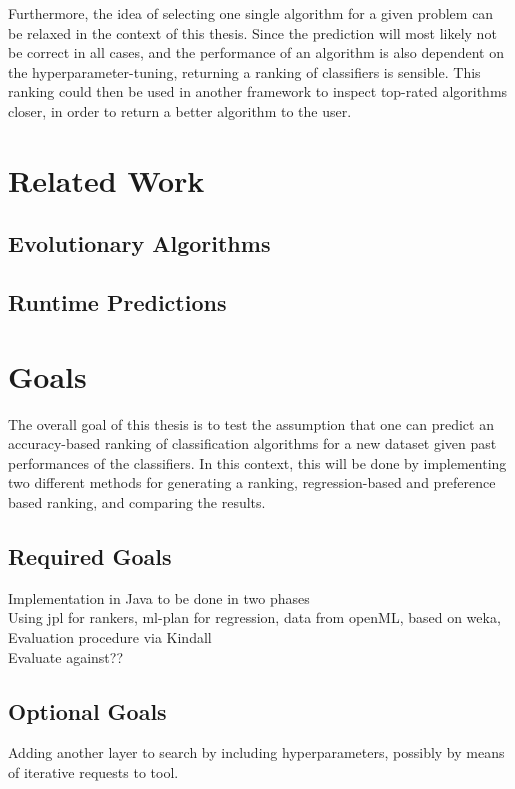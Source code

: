 \documentclass[12pt]{scrartcl}
\begin{document}
Furthermore, the idea of selecting one single algorithm for a given problem can be relaxed in the context of this thesis. Since the prediction will most likely not be correct in all cases, and the performance of an algorithm is also dependent on the hyperparameter-tuning, returning a ranking of classifiers is sensible. This ranking could then be used in another framework to inspect top-rated algorithms closer, in order to return a better algorithm to the user.  \\

\section{Related Work}\label{sec:related_work}
\subsection{Evolutionary Algorithms}
\subsection{Runtime Predictions}

\section{Goals}\label{sec:goals}
The overall goal of this thesis is to test the assumption that one can predict an accuracy-based ranking of classification algorithms for a new dataset given past performances of the classifiers. In this context, this will be done by implementing two different methods for generating a ranking, regression-based and preference based ranking, and comparing the results. 
\subsection{Required Goals}\label{subsec:required_goals}
Implementation in Java to be done in two phases\\
Using jpl for rankers, ml-plan for regression, data from openML, based on weka, 
Evaluation procedure via Kindall\\
Evaluate against??
\subsection{Optional Goals}\label{subsec:optional_goals}
Adding another layer to search by including hyperparameters, possibly by means of iterative requests to tool.
\end{document}
